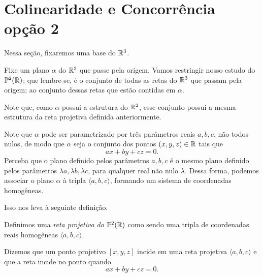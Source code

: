 \begin{comment}
Ou seja, a volta do problema é exatamente a ida "trocando" ponto por reta, e algo curioso do plano projetivo é que uma igualdade do tipo $ax+by+cz=0$ pode ser interpretada como, o ponto $[x,y,z]$ pertence a reta $<a,b,c>$ ou como o ponto $[a,b,c]$ pertence a reta $\langle x,y,z\rangle$, com isso para resolver a volta a gente vai fazer o seguinte truque:

Escolha uma base qualquer para $\RR^3$, imagine para cada reta que você calcular as coordenadas nos pontos com os mesmos números como coordenadas, no mundo dos pontos nos já sabemos que a conta fecha, e como a conta é exatamente a mesma para um mundo com retas e um mundo com pontos, temos que no munda das retas a conta também fecha, ou seja a volta é uma consequência direta da ida.
\end{proof}
\end{comment}

\section{Colinearidade e Concorrência opção 2}

Nessa seção, fixaremos uma base do \(\mathbb{R}^3\).

Fixe um plano $\alpha$ do \(\mathbb{R}^3\) que passe pela origem. 
Vamos restringir nosso estudo do \(\mathbb{P}^2(\mathbb{R})\); que lembre-se, é o conjunto de todas as retas do \(\mathbb{R}^3\) que passam pela origem; ao conjunto dessas retas que estão contidas em $\alpha$. 


Note que, como $\alpha$ possui a estrutura do $\mathbb{R}^2$, esse conjunto possui a mesma estrutura da reta projetiva definida anteriormente.

Note que $\alpha$ pode ser parametrizado por três parâmetros reais $a, b, c$, não todos nulos, de modo que $\alpha$ seja o conjunto dos pontos $(x, y, z) \in \mathbb{R}$ tais que \[
    ax + by + cz = 0.
\]
Perceba que o plano definido pelos parâmetros $a, b, c$ é o mesmo plano definido pelos parâmetros $\lambda a, \lambda b, \lambda c$, para qualquer real não nulo $\lambda$. Dessa forma, podemos associar o plano $\alpha$ à tripla $\langle a, b, c \rangle$, formando um sistema de coordenadas homogêneas.

Isso nos leva à seguinte definição.

\begin{defn}
Definimos uma \emph{reta projetiva do \(\mathbb{P}^2(\mathbb{R})\)} como sendo uma tripla de coordenadas reais homogêneas $\langle a, b, c \rangle$.

Dizemos que um ponto projetivo $[x, y, z]$ incide em uma reta projetiva $\langle a, b, c\rangle$ e que a reta incide no ponto quando \[
ax + by + cz = 0.
\]
\end{defn}

